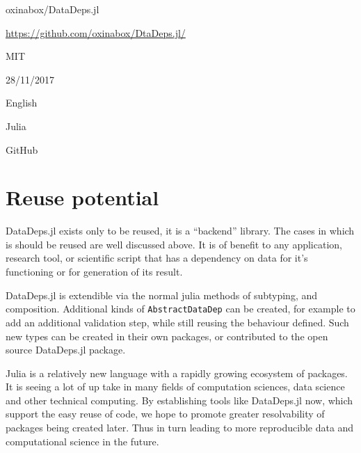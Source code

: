 \documentclass[dvinames]{josr}
\begin{document}
\begin{description}[noitemsep,topsep=0pt]
	\item[Name:] oxinabox/DataDeps.jl
	\item[Persistent identifier:] \url{https://github.com/oxinabox/DtaDeps.jl/}
	\item[Licence:] MIT
	\item[Date published:] 28/11/2017
	\item[Documentation Language] English
	\item[Programming Language] Julia
	\item[Code repository] GitHub
\end{description}


\section{Reuse potential}

DataDeps.jl exists only to be reused, it is a ``backend'' library.
The cases in which is should be reused are well discussed above.
It is of benefit to any application, research tool, or scientific script that has a dependency on data for it's functioning or for generation of its result.

DataDeps.jl is extendible via the normal julia methods of subtyping, and composition.
Additional kinds of \texttt{AbstractDataDep} can be created, for example to add an additional validation step, while still reusing the behaviour defined.
Such new types can be created in their own packages, or contributed to the open source DataDeps.jl package.


Julia is a relatively new language with a rapidly growing ecosystem of packages.
It is seeing a lot of up take in many fields of computation sciences, data science and other technical computing.
By establishing tools like DataDeps.jl now, which support the easy reuse of code,
we hope to promote greater resolvability of packages being created later.
Thus in turn leading to more reproducible data and computational science in the future.
\end{document}
